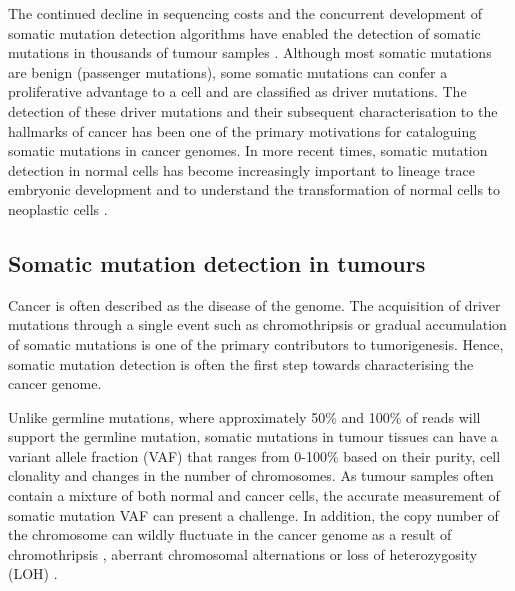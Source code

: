 The continued decline in sequencing costs and the concurrent development of somatic mutation detection algorithms have enabled the detection of somatic mutations in thousands of tumour samples \cite{Weinstein2013-ko, ICGCTCGA_Pan-Cancer_Analysis_of_Whole_Genomes_Consortium2020-ts}. Although most somatic mutations are benign (passenger mutations), some somatic mutations can confer a proliferative advantage to a cell and are classified as driver mutations. The detection of these driver mutations and their subsequent characterisation to the hallmarks of cancer \cite{Hanahan2000-dp, Hanahan2011-zr} has been one of the primary motivations for cataloguing somatic mutations in cancer genomes. In more recent times, somatic mutation detection in normal cells has become increasingly important to lineage trace embryonic development \cite{Behjati2014-gb} and to understand the transformation of normal cells to neoplastic cells \cite{Martincorena2015-io}. 


\subsection{Somatic mutation detection in tumours}

Cancer is often described as the disease of the genome. The acquisition of driver mutations through a single event such as chromothripsis \cite{Stephens2011-gj} or gradual accumulation of somatic mutations \cite{Doll1954-of, Knudson1971-fg} is one of the primary contributors to tumorigenesis. Hence, somatic mutation detection is often the first step towards characterising the cancer genome. 

Unlike germline mutations, where approximately 50\% and 100\% of reads will support the germline mutation, somatic mutations in tumour tissues can have a variant allele fraction (VAF) that ranges from 0-100\% based on their purity, cell clonality and changes in the number of chromosomes. As tumour samples often contain a mixture of both normal and cancer cells, the accurate measurement of somatic mutation VAF can present a challenge. In addition, the copy number of the chromosome can wildly fluctuate in the cancer genome as a result of chromothripsis \cite{Stephens2011-gj}, aberrant chromosomal alternations \cite{Albertson2003-lr, Frohling2008-uc} or loss of heterozygosity (LOH) \cite{Lasko1991-wq}. 

